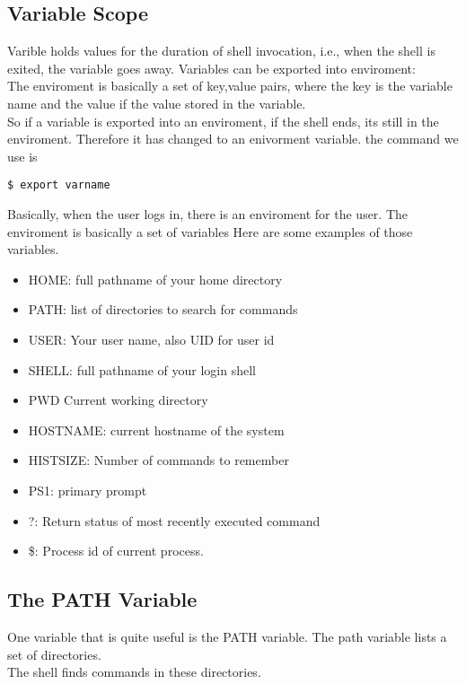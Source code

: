 \documentclass{report}
\begin{document}
\subsection{Variable Scope}
Varible holds values for the duration of shell invocation, i.e., when the shell is exited, the variable goes away.
\bigbreak \noindent
Variables can be exported into enviroment: \\ The enviroment is basically a set of key,value pairs, where the key is the variable name and the value if the value stored in the variable.
\\ So if a variable is exported into an enviroment, if the shell ends, its still in the enviroment. Therefore it has changed to an enivorment variable.
the command we use is
\begin{verbatim}
$ export varname
\end{verbatim}
Basically, when the user logs in, there is an enviroment for the user. The enviroment is basically a set of variables
\bigbreak \noindent
Here are some examples of those variables.
\begin{itemize}
  \item HOME: full pathname of your home directory
  \item PATH: list of directories to search for commands
  \item USER: Your user name, also UID for user id
  \item SHELL: full pathname of your login shell
  \item PWD Current working directory
  \item HOSTNAME: current hostname of the system
  \item HISTSIZE: Number of commands to remember
  \item PS1: primary prompt
  \item ?: Return status of most recently executed command
  \item \$: Process id of current process.
\end{itemize}
\subsection{The PATH Variable}
One variable that is quite useful is the PATH variable.
The path variable lists a set of directories. \\
The shell finds commands in these directories.
\bigbreak \noindent
\end{document}
